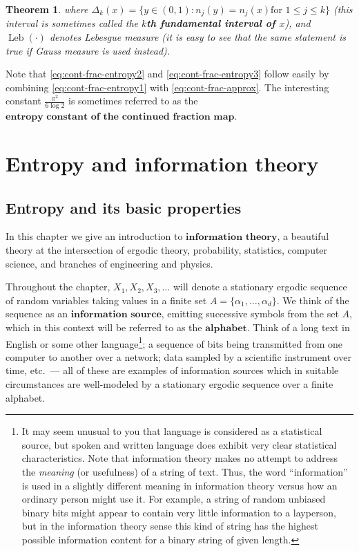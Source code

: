 \documentclass[11pt]{report}
\theoremstyle{plain}
\newtheorem{thm}{Theorem}[chapter]
\theoremstyle{definition}
\begin{document}
\begin{enumerate}[label=\arabic*.]
\begin{thm}
\noindent where
$\Delta_k(x) = \{ y\in (0,1) : n_j(y)=n_j(x) \textrm{
for }1\le j\le k\}$
(this interval is sometimes called the \textbf{$k$th
fundamental interval of $x$}), and
$\operatorname{Leb}(\cdot)$ denotes Lebesgue measure
(it is easy to see that the same statement is true if
Gauss measure is used instead).
\end{thm}

\noindent Note that \eqref{eq:cont-frac-entropy2} and
\eqref{eq:cont-frac-entropy3} follow easily by combining
\eqref{eq:cont-frac-entropy1} with
\eqref{eq:cont-frac-approx}. The interesting constant
$\frac{\pi^2}{6\log 2}$ is sometimes referred to as
the
$\textbf{entropy constant of the continued fraction
map}$.
\end{enumerate}

\chapter{Entropy and information theory}

\section{Entropy and its basic properties}

In this chapter we give an introduction to
$\textbf{information theory}$, a beautiful theory at
the intersection of ergodic theory, probability,
statistics, computer science, and branches of
engineering and physics.

Throughout the chapter, $X_1,X_2,X_3,\ldots$ will
denote a stationary ergodic sequence of random
variables taking values in a finite set
$A=\{\alpha_1,\ldots,\alpha_d \}$. We think of the
sequence as an $\textbf{information source}$,
emitting successive symbols from the set $A$, which
in this context will be referred to as the
$\textbf{alphabet}$. Think of a long text in English
or some other language\footnote{It may seem unusual to you that language is
considered as a statistical source, but spoken and
written language does exhibit very clear statistical
characteristics. Note that information theory makes no
attempt to address the \emph{meaning} (or usefulness) of a
string of text. Thus, the word ``information'' is used
in a slightly different meaning in information theory
versus how an ordinary person might use it. For
example, a string of random unbiased binary bits might
appear to contain very little information to a
layperson, but in the information theory sense this
kind of string has the highest possible information
content for a binary string of given length.}; a sequence of
bits being transmitted from one computer to another
over a network; data sampled by a scientific
instrument over time, etc.\ --- all of these are
examples of information sources which in suitable
circumstances are well-modeled by a stationary ergodic
sequence over a finite alphabet.
\end{document}
